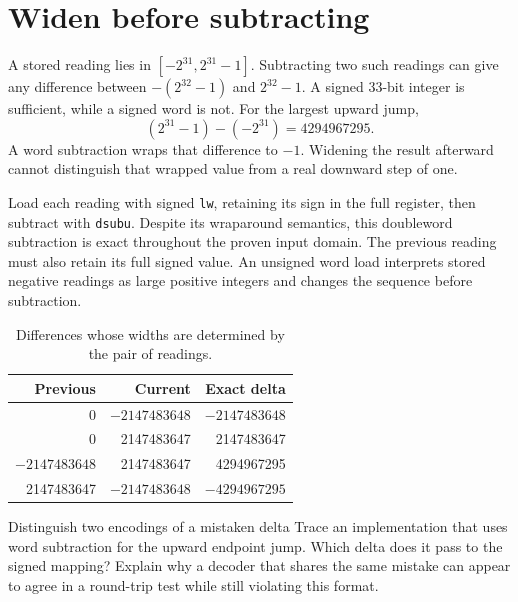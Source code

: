 \section{Widen before subtracting}
A stored reading lies in \([-2^{31},2^{31}-1]\). Subtracting two such readings can
give any difference between \(-(2^{32}-1)\) and \(2^{32}-1\). A signed 33-bit
integer is sufficient, while a signed word is not. For the largest upward jump,
\[
  (2^{31}-1)-(-2^{31})=4294967295.
\]
A word subtraction wraps that difference to \(-1\). Widening the result afterward
cannot distinguish that wrapped value from a real downward step of one.

Load each reading with signed \texttt{lw}, retaining its sign in the full register,
then subtract with \texttt{dsubu}. Despite its wraparound semantics, this doubleword
subtraction is exact throughout the proven input domain. The previous reading must
also retain its full signed value. An unsigned word load interprets stored negative
readings as large positive integers and changes the sequence before subtraction.

\begin{table}[htbp]
  \centering
  \caption{Differences whose widths are determined by the pair of readings.}
  \begin{tabular}{rrr}
    \toprule
    Previous        & Current         & Exact delta     \\
    \midrule
    0               & \(-2147483648\) & \(-2147483648\) \\
    0               & 2147483647      & 2147483647      \\
    \(-2147483648\) & 2147483647      & 4294967295      \\
    2147483647      & \(-2147483648\) & \(-4294967295\) \\
    \bottomrule
  \end{tabular}
\end{table}

\begin{MARSExercise}{Distinguish two encodings of a mistaken delta}
  Trace an implementation that uses word subtraction for the upward endpoint jump.
  Which delta does it pass to the signed mapping? Explain why a decoder that shares the
  same mistake can appear to agree in a round-trip test while still violating this format.
\end{MARSExercise}
